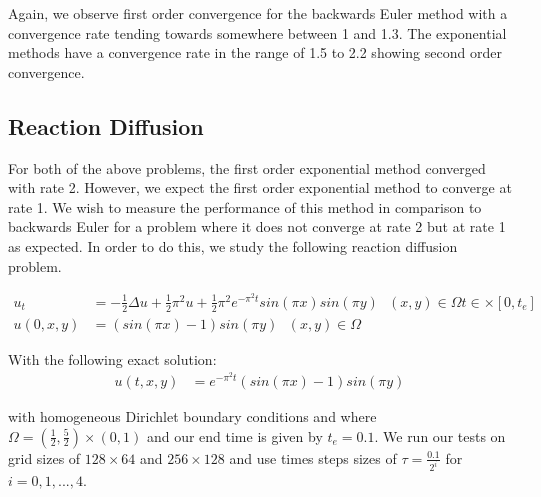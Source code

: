 Again, we observe first order convergence for the backwards Euler method with a convergence rate tending towards somewhere between 1 and 1.3.
The exponential methods have a convergence rate in the range of 1.5 to 2.2 showing second order convergence.

\subsection{Reaction Diffusion}

For both of the above problems, the first order exponential method converged with rate 2.
However, we expect the first order exponential method to converge at rate 1.
We wish to measure the performance of this method in comparison to backwards Euler for a problem where it does not converge at rate 2 but at rate 1 as expected.
In order to do this, we study the following reaction diffusion problem\cite{Huang2022}.

\begin{align*}
    u_t &= -\frac12\Delta u + \frac12 \pi^2u + \frac12 \pi^2 e^{-\pi^2t}sin(\pi x)sin(\pi y) \text{ } (x,y)\in\Omega t\in\times[0,t_e]\\
    u(0,x,y) &= (sin(\pi x) - 1)sin(\pi y) \text{ } (x,y)\in \Omega
\end{align*}

With the following exact solution:
\begin{align*}
    u(t, x, y) &= e^{-\pi^2t}(sin(\pi x) - 1)sin(\pi y)
\end{align*}

with homogeneous Dirichlet boundary conditions and where $\Omega = (\frac12, \frac52)\times(0,1)$ and our end time is given by $t_e = 0.1$.
We run our tests on grid sizes of $128\times64$ and $256\times128$ and use times steps sizes of $\tau=\frac{0.1}{2^i}$ for $i = 0,1,...,4$.



